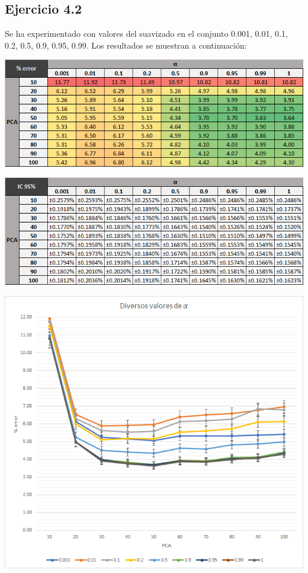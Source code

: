 \documentclass[a4paper]{article}
\begin{document}
\subsection{Ejercicio 4.2}
\quad Se ha experimentado con valores del suavizado en el conjunto {0.001, 0.01, 0.1, 0.2, 0.5, 0.9, 0.95, 0.99}. Los resultados se muestran a continuación:
\begin{center}
\includegraphics[width=\textwidth]{1_42_1}

\includegraphics[width=\textwidth]{1_42_2}

\includegraphics[width=\textwidth]{1_42_3}
\end{center}
\end{document}
